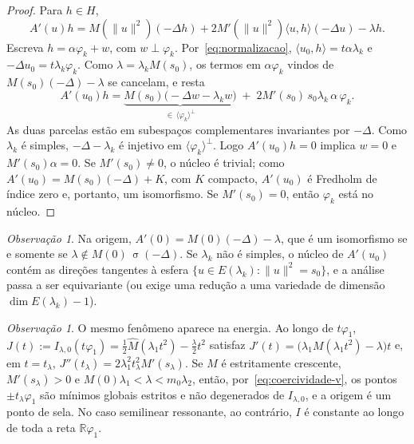 \documentclass[11pt,a4paper]{article}
\theoremstyle{plain}
\theoremstyle{definition}
\theoremstyle{remark}
\newtheorem{observacao}[teorema]{Observação}
\newcommand{\R}{\mathbb{R}}
\newcommand{\norm}[1]{\lVert #1\rVert}
\newcommand{\Mh}{\widehat{M}}
\DeclareMathOperator{\spec}{\sigma}
\begin{document}
\begin{proof}
Para $h\in H$,
\[
A'(u)h=M(\norm{u}^2)(-\Delta h)+2M'(\norm{u}^2)\langle u,h\rangle(-\Delta u)-\lambda h .
\]
Escreva $h=\alpha\varphi_k+w$, com $w\perp\varphi_k$. Por~\eqref{eq:normalizacao},
$\langle u_0,h\rangle=t\alpha\lambda_k$ e $-\Delta u_0=t\lambda_k\varphi_k$. Como
$\lambda=\lambda_kM(s_0)$, os termos em $\alpha\varphi_k$ vindos de
$M(s_0)(-\Delta)-\lambda$ se cancelam, e resta
\begin{equation}\label{eq:linearizacao}
A'(u_0)h=\underbrace{M(s_0)\bigl(-\Delta w-\lambda_kw\bigr)}_{\in\,\langle\varphi_k\rangle^\perp}
\;+\;2M'(s_0)\,s_0\lambda_k\,\alpha\,\varphi_k .
\end{equation}
As duas parcelas estão em subespaços complementares invariantes por $-\Delta$.
Como $\lambda_k$ é simples, $-\Delta-\lambda_k$ é injetivo em
$\langle\varphi_k\rangle^\perp$. Logo $A'(u_0)h=0$ implica $w=0$ e
$M'(s_0)\alpha=0$. Se $M'(s_0)\ne0$, o núcleo é trivial; como
$A'(u_0)=M(s_0)(-\Delta)+K$, com $K$ compacto, $A'(u_0)$ é Fredholm de índice
zero e, portanto, um isomorfismo. Se $M'(s_0)=0$, então $\varphi_k$ está no
núcleo.
\end{proof}

\begin{observacao}\label{obs:naodeg-zero}
Na origem, $A'(0)=M(0)(-\Delta)-\lambda$, que é um isomorfismo se e somente se
$\lambda\notin M(0)\,\spec(-\Delta)$. Se $\lambda_k$ não é simples, o
núcleo de $A'(u_0)$ contém as direções tangentes à esfera
$\{u\in E(\lambda_k):\norm{u}^2=s_0\}$, e a análise passa a ser equivariante
(ou exige uma redução a uma variedade de dimensão $\dim E(\lambda_k)-1$).
\end{observacao}

\begin{observacao}\label{obs:energia}
O mesmo fenômeno aparece na energia. Ao longo de $t\varphi_1$,
$J(t):=I_{\lambda,0}(t\varphi_1)=\frac12\Mh(\lambda_1t^2)-\frac{\lambda}{2}t^2$
satisfaz $J'(t)=\bigl(\lambda_1M(\lambda_1t^2)-\lambda\bigr)t$ e, em
$t=t_\lambda$, $J''(t_\lambda)=2\lambda_1^2t_\lambda^2M'(s_\lambda)$. Se $M$ é
estritamente crescente, $M'(s_\lambda)>0$ e
$M(0)\lambda_1<\lambda<m_0\lambda_2$, então, por~\eqref{eq:coercividade-v}, os pontos $\pm t_\lambda\varphi_1$
são mínimos globais estritos e não degenerados de $I_{\lambda,0}$, e a origem é
um ponto de sela. No caso semilinear ressonante, ao contrário, $I$ é constante
ao longo de toda a reta $\R\varphi_1$.
\end{observacao}
\end{document}
